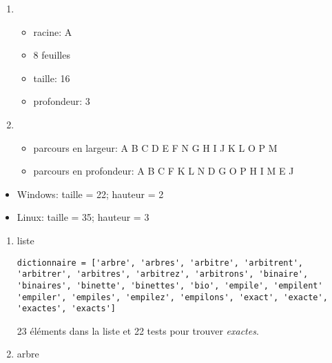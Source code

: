 \documentclass[a4paper,11pt]{article}
\begin{document}
\begin{Form}
\begin{exo}
\begin{enumerate}
\item \begin{itemize}
\item racine: A
\item 8 feuilles
\item taille: 16
\item profondeur: 3
\end{itemize}
\item \begin{itemize}
\item parcours en largeur: A B C D E F N G H I J K L O P M
\item parcours en profondeur: A B C F K L N D G O P H I M E J
\end{itemize}
\end{enumerate}
\end{exo}
\begin{exo}
\begin{itemize}
\item Windows: taille = 22; hauteur = 2
\item Linux: taille = 35; hauteur = 3
\end{itemize}
\end{exo}
\begin{exo}
\begin{enumerate}
\item liste
\begin{lstlisting}
dictionnaire = ['arbre', 'arbres', 'arbitre', 'arbitrent', 'arbitrer', 'arbitres', 'arbitrez', 'arbitrons', 'binaire', 'binaires', 'binette', 'binettes', 'bio', 'empile', 'empilent' 'empiler', 'empiles', 'empilez', 'empilons', 'exact', 'exacte', 'exactes', 'exacts']
\end{lstlisting}
23 éléments dans la liste et 22 tests pour trouver \emph{exactes}.
\item arbre
\begin{center}
\end{center}
\end{enumerate}
\end{exo}
\end{Form}
\end{document}
